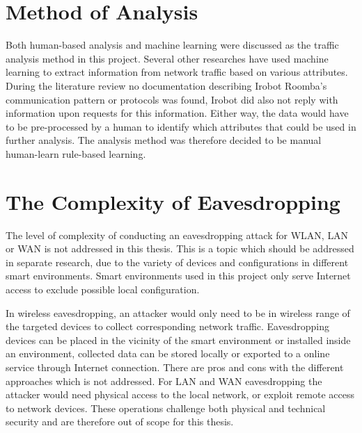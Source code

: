 \section{Method of Analysis}
Both human-based analysis and machine learning were discussed as the traffic analysis method in this project. Several other researches have used machine learning to extract information from network traffic based on various attributes. During the literature review no documentation describing Irobot Roomba's communication pattern or protocols was found, Irobot did also not reply with information upon requests for this information. Either way, the data would have to be pre-processed by a human to identify which attributes that could be used in further analysis. The analysis method was therefore decided to be manual human-learn rule-based learning. 

\section{The Complexity of Eavesdropping}
The level of complexity of conducting an eavesdropping attack for \gls{WLAN}, \gls{LAN} or \gls{WAN} is not addressed in this thesis. This is a topic which should be addressed in separate research, due to the variety of devices and configurations in different smart environments. Smart environments used in this project only serve Internet access to exclude possible local configuration. 

In wireless eavesdropping, an attacker would only need to be in wireless range of the targeted devices to collect corresponding network traffic. Eavesdropping devices can be placed in the vicinity of the smart environment or installed inside an environment, collected data can be stored locally or exported to a online service through Internet connection. There are pros and cons with the different approaches which is not addressed. For \gls{LAN} and \gls{WAN} eavesdropping the attacker would need physical access to the local network, or exploit remote access to network devices. These operations challenge both physical and technical security and are therefore out of scope for this thesis. 



